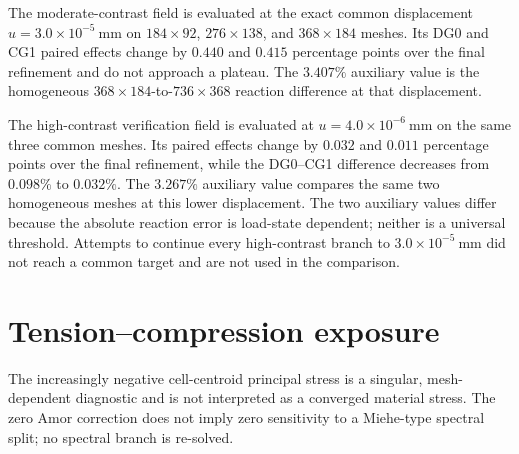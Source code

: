 \documentclass[review,12pt]{elsarticle}
\begin{document}
The moderate-contrast field is evaluated at the exact common displacement
\(u=3.0\times10^{-5}\ \mathrm{mm}\) on \(184\times92\),
\(276\times138\), and \(368\times184\) meshes. Its DG0 and CG1 paired
effects change by \(0.440\) and \(0.415\) percentage points over the final
refinement and do not approach a plateau. The \(3.407\%\) auxiliary value is the
homogeneous \(368\times184\)-to-\(736\times368\) reaction difference at that
displacement.

The high-contrast verification field is evaluated at
\(u=4.0\times10^{-6}\ \mathrm{mm}\) on the same three common meshes. Its
paired effects change by \(0.032\) and \(0.011\) percentage points over the
final refinement, while the DG0--CG1 difference decreases from \(0.098\%\) to
\(0.032\%\). The \(3.267\%\) auxiliary value compares the same two homogeneous
meshes at this lower displacement. The two auxiliary values differ because the
absolute reaction error is load-state dependent; neither is a universal
threshold. Attempts to continue every high-contrast branch to
\(3.0\times10^{-5}\ \mathrm{mm}\) did not reach a common target and are not
used in the comparison.

\section{Tension--compression exposure}
\label{sec:supp-split}

\begin{table}[!htbp]
\centering
\small
\caption{Fixed-state tension-compression exposure at
$u=4.0\times10^{-5}\ \mathrm{mm}$. Split corrections are normalized by the
full-degradation elastic energy; spectral driving exposure is normalized by
the complete damage-driving integral.}
\label{tab:S5}
\end{table}

The increasingly negative cell-centroid principal stress is a singular,
mesh-dependent diagnostic and is not interpreted as a converged material
stress. The zero Amor correction does not imply zero sensitivity to a
Miehe-type spectral split; no spectral branch is re-solved.
\end{document}
